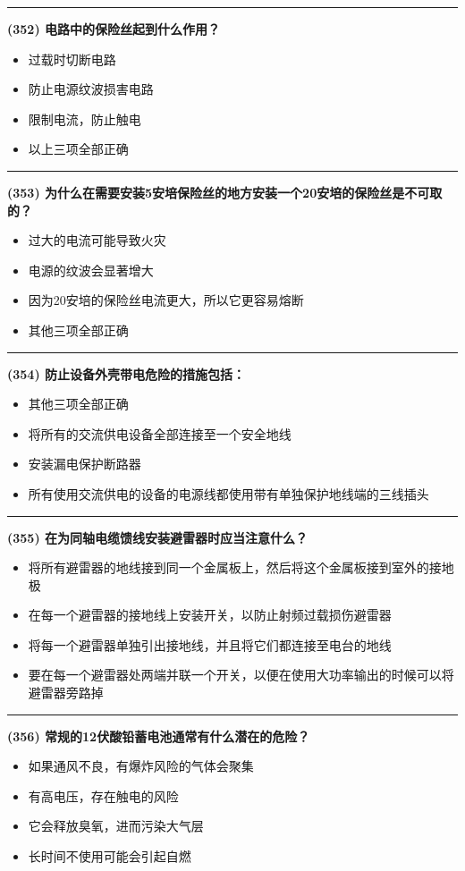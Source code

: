\documentclass[twocolumn]{ctexart}  %
\begin{document}
\noindent\rule{0.5\textwidth}{1pt}
\heiti \textbf{(352) 电路中的保险丝起到什么作用？} \songti {\color{gray} [LK1225] }
\begin{itemize}
	\item  过载时切断电路
	\item  防止电源纹波损害电路
	\item  限制电流，防止触电
	\item  以上三项全部正确
\end{itemize}


\noindent\rule{0.5\textwidth}{1pt}
\heiti \textbf{(353) 为什么在需要安装5安培保险丝的地方安装一个20安培的保险丝是不可取的？} \songti {\color{gray} [LK1226] }
\begin{itemize}
	\item  过大的电流可能导致火灾
	\item  电源的纹波会显著增大
	\item  因为20安培的保险丝电流更大，所以它更容易熔断
	\item  其他三项全部正确
\end{itemize}


\noindent\rule{0.5\textwidth}{1pt}
\heiti \textbf{(354) 防止设备外壳带电危险的措施包括：} \songti {\color{gray} [LK1227] }
\begin{itemize}
	\item  其他三项全部正确
	\item  将所有的交流供电设备全部连接至一个安全地线
	\item  安装漏电保护断路器
	\item  所有使用交流供电的设备的电源线都使用带有单独保护地线端的三线插头
\end{itemize}


\noindent\rule{0.5\textwidth}{1pt}
\heiti \textbf{(355) 在为同轴电缆馈线安装避雷器时应当注意什么？} \songti {\color{gray} [LK1228] }
\begin{itemize}
	\item  将所有避雷器的地线接到同一个金属板上，然后将这个金属板接到室外的接地极
	\item  在每一个避雷器的接地线上安装开关，以防止射频过载损伤避雷器
	\item  将每一个避雷器单独引出接地线，并且将它们都连接至电台的地线
	\item  要在每一个避雷器处两端并联一个开关，以便在使用大功率输出的时候可以将避雷器旁路掉
\end{itemize}


\noindent\rule{0.5\textwidth}{1pt}
\heiti \textbf{(356) 常规的12伏酸铅蓄电池通常有什么潜在的危险？} \songti {\color{gray} [LK1230] }
\begin{itemize}
	\item  如果通风不良，有爆炸风险的气体会聚集
	\item  有高电压，存在触电的风险
	\item  它会释放臭氧，进而污染大气层
	\item  长时间不使用可能会引起自燃
\end{itemize}
\end{document}
